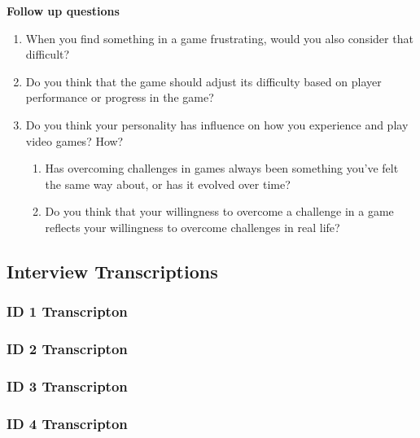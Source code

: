 \textbf{Follow up questions}
\begin{enumerate}
    \item When you find something in a game frustrating, would you also consider that difficult?
    \item Do you think that the game should adjust its difficulty based on player performance or progress in the game?
    \item Do you think your personality has influence on how you experience and play video games? How?
    \begin{enumerate}
        \item Has overcoming challenges in games always been something you’ve felt the same way about, or has it evolved over time?
        \item Do you think that your willingness to overcome a challenge in a game reflects your willingness to overcome challenges in real life?
    \end{enumerate}
\end{enumerate}

\subsection{Interview Transcriptions}

\subsubsection{ID 1 Transcripton} \label{ID1 Transcript}
 

\subsubsection{ID 2 Transcripton} \label{ID2 Transcript}
 

\subsubsection{ID 3 Transcripton} \label{ID3 Transcript}
 

\subsubsection{ID 4 Transcripton} \label{ID4 Transcript}
 